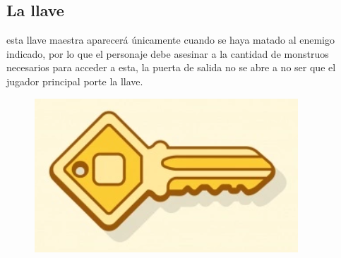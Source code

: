 \documentclass{article}
\begin{document}
\newpage


\subsection{La llave}
esta llave maestra aparecerá únicamente cuando se haya matado al enemigo indicado, por lo que el personaje debe asesinar a la cantidad de monstruos necesarios para acceder a esta, la puerta de salida no se abre a no ser que el jugador principal porte la llave.



\begin{figure}[h!]
    \centering
    \includegraphics{key.png}
\end{figure}
\end{document}
